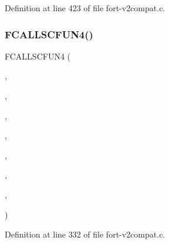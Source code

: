 Definition at line 423 of file fort-\/v2compat.\+c.

\mbox{\label{fort-v2compat_8c_ad5956b6f21e33272ade6d259159190d3}} 
\subsubsection{\texorpdfstring{F\+C\+A\+L\+L\+S\+C\+F\+U\+N4()}{FCALLSCFUN4()}}
{\footnotesize\ttfamily F\+C\+A\+L\+L\+S\+C\+F\+U\+N4 (\begin{DoxyParamCaption}\item[{\hyperlink{ncfortran_8h_aec6fe8ae8c73cf5133d4ed64f86ff028}{N\+F\+\_\+\+I\+NT}}]{,  }\item[{\hyperlink{nf__v2compat_8c_af79c1df7fa3f1a225cfc0a15bf6b7091}{c\+\_\+ncddef}}]{,  }\item[{N\+C\+D\+D\+EF}]{,  }\item[{\hyperlink{nf__fortv2_8f90_a78171f3b2ee4a6763e764c357d57836e}{ncddef}}]{,  }\item[{N\+C\+ID}]{,  }\item[{S\+T\+R\+I\+NG}]{,  }\item[{\hyperlink{fort-v2compat_8c_a794de1e244ded083e471dd00db1329b1}{D\+I\+M\+L\+EN}}]{,  }\item[{\hyperlink{fort-v2compat_8c_ae2352f39cbd25bcaf1bedbbb12db73fe}{P\+R\+C\+O\+DE}}]{ }\end{DoxyParamCaption})}



Definition at line 332 of file fort-\/v2compat.\+c.

\mbox{\label{fort-v2compat_8c_a1ae6a5d3202cf2c8d9c3f38c9345b089}} 
